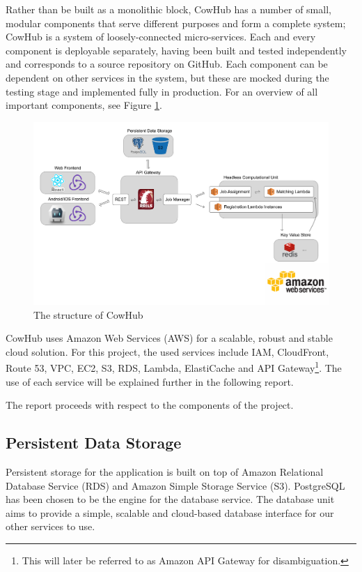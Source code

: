 Rather than be built as a monolithic block, CowHub has a number of small, modular components that serve different purposes and form a complete system; CowHub is a system of loosely-connected micro-services. Each and every component is deployable separately, having been built and tested independently and corresponds to a source repository on GitHub. Each component can be dependent on other services in the system, but these are mocked during the testing stage and implemented fully in production. For an overview of all important components, see Figure \ref{fig:structure}.

\begin{figure}
  \includegraphics[width=\textwidth]{sketch/structure.pdf}
  \caption{The structure of CowHub}
  \label{fig:structure}
\end{figure}

CowHub uses Amazon Web Services (AWS) for a scalable, robust and stable cloud solution. For this project, the used services include IAM, CloudFront, Route 53, VPC, EC2, S3, RDS, Lambda, ElastiCache and API Gateway\footnote{This will later be referred to as Amazon API Gateway for disambiguation.}. The use of each service will be explained further in the following report.

The report proceeds with respect to the components of the project.

\subsection{Persistent Data Storage}
Persistent storage for the application is built on top of Amazon Relational Database Service (RDS) and Amazon Simple Storage Service (S3). PostgreSQL has been chosen to be the engine for the database service. The database unit aims to provide a simple, scalable and cloud-based database interface for our other services to use.

